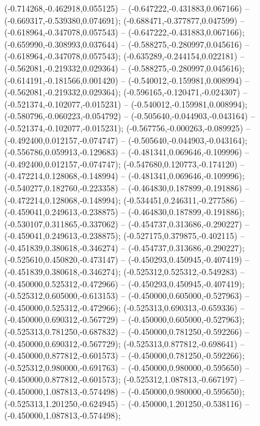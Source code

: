  (-0.714268,-0.462918,0.055125) -- (-0.647222,-0.431883,0.067166) -- (-0.669317,-0.539380,0.074691);
 (-0.688471,-0.377877,0.047599) -- (-0.618964,-0.347078,0.057543) -- (-0.647222,-0.431883,0.067166);
 (-0.659990,-0.308993,0.037644) -- (-0.588275,-0.280997,0.045616) -- (-0.618964,-0.347078,0.057543);
 (-0.635289,-0.244154,0.022181) -- (-0.562081,-0.219332,0.029364) -- (-0.588275,-0.280997,0.045616);
 (-0.614191,-0.181566,0.001420) -- (-0.540012,-0.159981,0.008994) -- (-0.562081,-0.219332,0.029364);
 (-0.596165,-0.120471,-0.024307) -- (-0.521374,-0.102077,-0.015231) -- (-0.540012,-0.159981,0.008994);
 (-0.580796,-0.060223,-0.054792) -- (-0.505640,-0.044903,-0.043164) -- (-0.521374,-0.102077,-0.015231);
 (-0.567756,-0.000263,-0.089925) -- (-0.492400,0.012157,-0.074747) -- (-0.505640,-0.044903,-0.043164);
 (-0.556786,0.059913,-0.129683) -- (-0.481341,0.069646,-0.109996) -- (-0.492400,0.012157,-0.074747);
 (-0.547680,0.120773,-0.174120) -- (-0.472214,0.128068,-0.148994) -- (-0.481341,0.069646,-0.109996);
 (-0.540277,0.182760,-0.223358) -- (-0.464830,0.187899,-0.191886) -- (-0.472214,0.128068,-0.148994);
 (-0.534451,0.246311,-0.277586) -- (-0.459041,0.249613,-0.238875) -- (-0.464830,0.187899,-0.191886);
 (-0.530107,0.311865,-0.337062) -- (-0.454737,0.313686,-0.290227) -- (-0.459041,0.249613,-0.238875);
 (-0.527175,0.379875,-0.402115) -- (-0.451839,0.380618,-0.346274) -- (-0.454737,0.313686,-0.290227);
 (-0.525610,0.450820,-0.473147) -- (-0.450293,0.450945,-0.407419) -- (-0.451839,0.380618,-0.346274);
 (-0.525312,0.525312,-0.549283) -- (-0.450000,0.525312,-0.472966) -- (-0.450293,0.450945,-0.407419);
 (-0.525312,0.605000,-0.613153) -- (-0.450000,0.605000,-0.527963) -- (-0.450000,0.525312,-0.472966);
 (-0.525313,0.690313,-0.659336) -- (-0.450000,0.690312,-0.567729) -- (-0.450000,0.605000,-0.527963);
 (-0.525313,0.781250,-0.687832) -- (-0.450000,0.781250,-0.592266) -- (-0.450000,0.690312,-0.567729);
 (-0.525313,0.877812,-0.698641) -- (-0.450000,0.877812,-0.601573) -- (-0.450000,0.781250,-0.592266);
 (-0.525312,0.980000,-0.691763) -- (-0.450000,0.980000,-0.595650) -- (-0.450000,0.877812,-0.601573);
 (-0.525312,1.087813,-0.667197) -- (-0.450000,1.087813,-0.574498) -- (-0.450000,0.980000,-0.595650);
 (-0.525313,1.201250,-0.624945) -- (-0.450000,1.201250,-0.538116) -- (-0.450000,1.087813,-0.574498);
